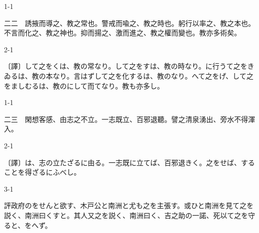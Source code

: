 \documentclass[tate,paper=b6j,jafontsize=9pt]{jlreq}
\begin{document}
\begin{azconvIndented}{1\zw}{-1\zw}

二二　誘掖而導之、教之常也。警戒而喩之、教之時也。躬行以率之、教之本也。不言而化之、教之神也。抑而揚之、激而進之、教之權而變也。教亦多術矣。

\end{azconvIndented}
\begin{azconvIndented}{2\zw}{-1\zw}

〔譯〕して之をくは、教の常なり。して之をすは、教の時なり。に行うて之をきゐるは、教の本なり。言はずして之を化するは、教のなり。へて之をげ、して之をましむるは、教のにして而てなり。教も亦多し。

\end{azconvIndented}

\begin{azconvIndented}{1\zw}{-1\zw}

二三　閑想客感、由志之不\azconvKunten{\azconvIR}立。一志既立、百邪退聽。譬之清泉湧出、旁水不\azconvKunten{\azconvIR}得渾入。

\end{azconvIndented}
\begin{azconvIndented}{2\zw}{-1\zw}

〔譯〕は、志の立たざるに由る。一志既に立てば、百邪退きく。之をせば、することを得ざるにふべし。

\end{azconvIndented}
\begin{azconvIndented}{3\zw}{-1\zw}

評政府のをせんと欲す、木戸公と南洲と尤も之を主張す。或ひと南洲を見て之を説く、南洲曰くすと。其人又之を説く、南洲曰く、吉之助の一諾、死以て之を守ると、をへず。

\end{azconvIndented}
\end{document}

